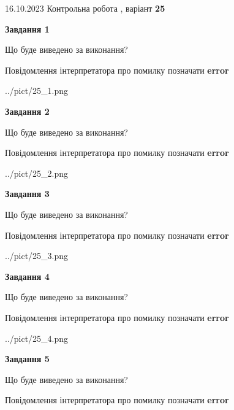 \documentclass[12pt, ukrainian]{article}
\begin{document}
{\Large{16.10.2023 Контрольна робота , варіант  \No \textbf { 25 }\par}}
{
\begin {large}
{\begin {center}\textbf{Завдання 1}\end {center}}\par
Що буде виведено за виконання? \par
Повідомлення інтерпретатора про помилку позначати \textbf{error}

\begin{center}
	{../pict/25_1.png}
\end{center}
\newpage

{\begin {center}\textbf{Завдання 2}\end {center}}\par
Що буде виведено за виконання? \par
Повідомлення інтерпретатора про помилку позначати \textbf{error}

\begin{center}
	{../pict/25_2.png}
\end{center}
\newpage

{\begin {center}\textbf{Завдання 3}\end {center}}\par
Що буде виведено за виконання? \par
Повідомлення інтерпретатора про помилку позначати \textbf{error}

\begin{center}
	{../pict/25_3.png}
\end{center}
\newpage

{\begin {center}\textbf{Завдання 4}\end {center}}\par
Що буде виведено за виконання? \par
Повідомлення інтерпретатора про помилку позначати \textbf{error}

\begin{center}
	{../pict/25_4.png}
\end{center}
\newpage

{\begin {center}\textbf{Завдання 5}\end {center}}\par
Що буде виведено за виконання? \par
Повідомлення інтерпретатора про помилку позначати \textbf{error}


\end{large}}
\end{document}
